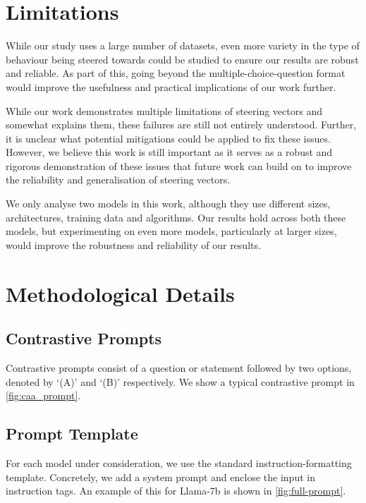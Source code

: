 \documentclass{article}
\begin{document}
\section{Limitations}\label{sec:limitations}
While our study uses a large number of datasets, even more variety in the type of behaviour being steered towards could be studied to ensure our results are robust and reliable. As part of this, going beyond the multiple-choice-question format would improve the usefulness and practical implications of our work further.

While our work demonstrates multiple limitations of steering vectors and somewhat explains them, these failures are still not entirely understood. Further, it is unclear what potential mitigations could be applied to fix these issues. However, we believe this work is still important as it serves as a robust and rigorous demonstration of these issues that future work can build on to improve the reliability and generalisation of steering vectors.

We only analyse two models in this work, although they use different sizes, architectures, training data and algorithms. Our results hold across both these models, but experimenting on even more models, particularly at larger sizes, would improve the robustness and reliability of our results.



\section{Methodological Details}\label{sec:app_method}
\subsection{Contrastive Prompts}
Contrastive prompts consist of a question or statement followed by two options, denoted by `(A)' and `(B)' respectively. We show a typical contrastive prompt in \cref{fig:caa_prompt}. 

\subsection{Prompt Template} For each model under consideration, we use the standard instruction-formatting template. Concretely, we add a system prompt and enclose the input in instruction tags. An example of this for Llama-7b is shown in \cref{fig:full-prompt}.
\end{document}
